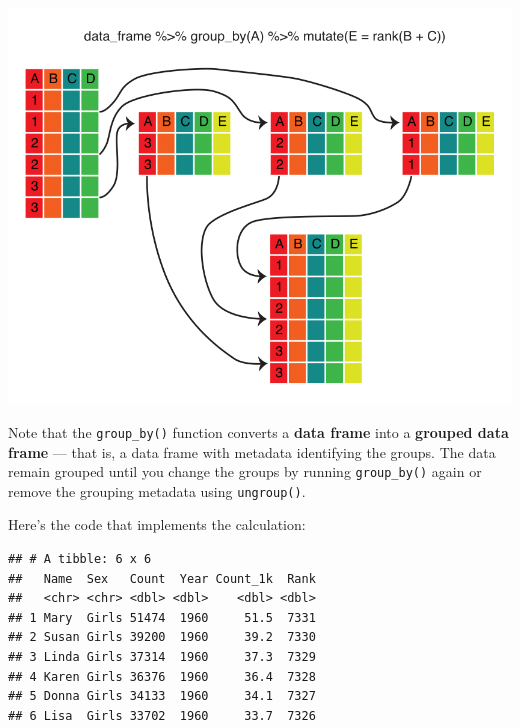 \documentclass[
]{book}
\newenvironment{Shaded}{\begin{snugshade}}{\end{snugshade}}
\newcommand{\DataTypeTok}[1]{\textcolor[rgb]{0.13,0.29,0.53}{#1}}
\newcommand{\KeywordTok}[1]{\textcolor[rgb]{0.13,0.29,0.53}{\textbf{#1}}}
\newcommand{\NormalTok}[1]{#1}
\newcommand{\OperatorTok}[1]{\textcolor[rgb]{0.81,0.36,0.00}{\textbf{#1}}}
\newcommand{\StringTok}[1]{\textcolor[rgb]{0.31,0.60,0.02}{#1}}
\begin{document}
\includegraphics{R/Rintro/images/mutate_group_by.png}

Note that the \texttt{group\_by()} function converts a \textbf{data frame} into a
\textbf{grouped data frame} --- that is, a data frame with metadata identifying
the groups. The data remain grouped until you change the groups by
running \texttt{group\_by()} again or remove the grouping metadata using
\texttt{ungroup()}.

Here's the code that implements the calculation:

\begin{Shaded}
\end{Shaded}

\begin{verbatim}
## # A tibble: 6 x 6
##   Name  Sex   Count  Year Count_1k  Rank
##   <chr> <chr> <dbl> <dbl>    <dbl> <dbl>
## 1 Mary  Girls 51474  1960     51.5  7331
## 2 Susan Girls 39200  1960     39.2  7330
## 3 Linda Girls 37314  1960     37.3  7329
## 4 Karen Girls 36376  1960     36.4  7328
## 5 Donna Girls 34133  1960     34.1  7327
## 6 Lisa  Girls 33702  1960     33.7  7326
\end{verbatim}
\end{document}
